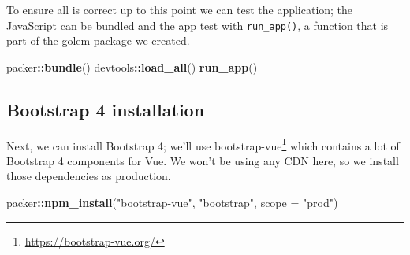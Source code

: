 \documentclass[
  10pt,
]{krantz}
\makeatletter
\newenvironment{Shaded}{\begin{snugshade}}{\end{snugshade}}
\newcommand{\ControlFlowTok}[1]{\textcolor[rgb]{0.27,0.27,0.27}{\textbf{#1}}}
\newcommand{\DataTypeTok}[1]{\textcolor[rgb]{0.27,0.27,0.27}{#1}}
\newcommand{\KeywordTok}[1]{\textcolor[rgb]{0.27,0.27,0.27}{\textbf{#1}}}
\newcommand{\NormalTok}[1]{#1}
\newcommand{\OperatorTok}[1]{\textcolor[rgb]{0.43,0.43,0.43}{\textbf{#1}}}
\newcommand{\StringTok}[1]{\textcolor[rgb]{0.5,0.5,0.5}{#1}}
\renewcommand{\href}[2]{#2\footnote{\url{#1}}}
\newenvironment{kframe}{%
\medskip{}
\setlength{\fboxsep}{.8em}
 \def\at@end@of@kframe{}%
 \ifinner\ifhmode%
  \def\at@end@of@kframe{\end{minipage}}%
  \begin{minipage}{\columnwidth}%
 \fi\fi%
 \def\FrameCommand##1{\hskip\@totalleftmargin \hskip-\fboxsep
 \colorbox{shadecolor}{##1}\hskip-\fboxsep
     \hskip-\linewidth \hskip-\@totalleftmargin \hskip\columnwidth}%
 \MakeFramed {\advance\hsize-\width
   \@totalleftmargin\z@ \linewidth\hsize
   \@setminipage}}%
 {\par\unskip\endMakeFramed%
 \at@end@of@kframe}
\renewenvironment{Shaded}{\begin{kframe}}{\end{kframe}}
\makeatother
\begin{document}
\begin{Shaded}
\end{Shaded}

To ensure all is correct up to this point we can test the application; the JavaScript can be bundled and the app test with \texttt{run\_app()}, a function that is part of the golem package we created.

\begin{Shaded}
\begin{Highlighting}[]
\NormalTok{packer}\OperatorTok{::}\KeywordTok{bundle}\NormalTok{()}
\NormalTok{devtools}\OperatorTok{::}\KeywordTok{load\_all}\NormalTok{()}
\KeywordTok{run\_app}\NormalTok{()}
\end{Highlighting}
\end{Shaded}

\hypertarget{packer-adv-shiny-vue-bs4}{%
\subsection{Bootstrap 4 installation}\label{packer-adv-shiny-vue-bs4}}

Next, we can install Bootstrap 4; we'll use \href{https://bootstrap-vue.org/}{bootstrap-vue} which contains a lot of Bootstrap 4 components for Vue. We won't be using any CDN here, so we install those dependencies as production.

\begin{Shaded}
\begin{Highlighting}[]
\NormalTok{packer}\OperatorTok{::}\KeywordTok{npm\_install}\NormalTok{(}\StringTok{"bootstrap{-}vue"}\NormalTok{, }\StringTok{"bootstrap"}\NormalTok{, }\DataTypeTok{scope =} \StringTok{"prod"}\NormalTok{)}
\end{Highlighting}
\end{Shaded}
\end{document}
